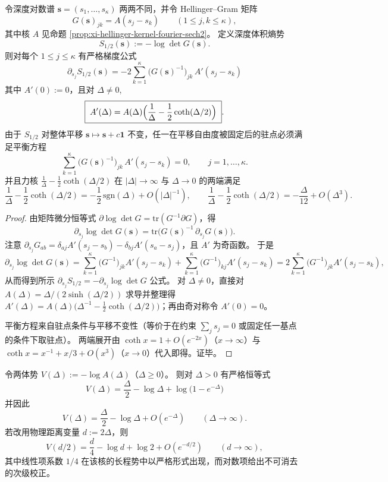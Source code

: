 \begin{proposition}[深度体积熵势的精确一阶变分与平衡方程]\label{prop:xi-hellinger-gram-first-variation-equilibrium}
令深度对数谱 \(\mathbf s=(s_1,\dots,s_\kappa)\) 两两不同，并令 Hellinger--Gram 矩阵
\[
G(\mathbf s)_{jk}=A(s_j-s_k)\qquad(1\le j,k\le \kappa),
\]
其中核 \(A\) 见命题 \ref{prop:xi-hellinger-kernel-fourier-sech2}。
定义深度体积熵势
\[
S_{1/2}(\mathbf s):=-\log\det G(\mathbf s).
\]
则对每个 \(1\le j\le \kappa\) 有严格梯度公式
\[
\boxed{\;
\partial_{s_j}S_{1/2}(\mathbf s)
=-2\sum_{k=1}^{\kappa}\bigl(G(\mathbf s)^{-1}\bigr)_{jk}\,A'(s_j-s_k)\;}
\]
其中 \(A'(0):=0\)，且对 \(\Delta\neq 0\),
\[
\boxed{\;
A'(\Delta)
=A(\Delta)\Bigl(\frac{1}{\Delta}-\frac12\coth(\Delta/2)\Bigr)\; }.
\]
由于 \(S_{1/2}\) 对整体平移 \(\mathbf s\mapsto \mathbf s+c\mathbf 1\) 不变，任一在平移自由度被固定后的驻点必须满足平衡方程
\[
\sum_{k=1}^{\kappa}\bigl(G(\mathbf s)^{-1}\bigr)_{jk}\,A'(s_j-s_k)=0,\qquad j=1,\dots,\kappa.
\]
并且力核 \(\frac{1}{\Delta}-\frac12\coth(\Delta/2)\) 在 \(|\Delta|\to\infty\) 与 \(\Delta\to 0\) 的两端满足
\[
\frac{1}{\Delta}-\frac12\coth(\Delta/2)= -\frac12\,\mathrm{sgn}(\Delta)+O(|\Delta|^{-1}),
\qquad
\frac{1}{\Delta}-\frac12\coth(\Delta/2)=-\frac{\Delta}{12}+O(\Delta^3).
\]
\end{proposition}
\begin{proof}
由矩阵微分恒等式 \(\partial\log\det G=\mathrm{tr}(G^{-1}\partial G)\)，得
\[
\partial_{s_j}\log\det G(\mathbf s)=\mathrm{tr}\bigl(G(\mathbf s)^{-1}\,\partial_{s_j}G(\mathbf s)\bigr).
\]
注意 \(\partial_{s_j}G_{ab}=\delta_{aj}A'(s_j-s_b)-\delta_{bj}A'(s_a-s_j)\)，且 \(A'\) 为奇函数。
于是
\[
\partial_{s_j}\log\det G(\mathbf s)
=\sum_{k=1}^{\kappa}\bigl(G^{-1}\bigr)_{jk}A'(s_j-s_k)
+\sum_{k=1}^{\kappa}\bigl(G^{-1}\bigr)_{kj}A'(s_j-s_k)
=2\sum_{k=1}^{\kappa}\bigl(G^{-1}\bigr)_{jk}A'(s_j-s_k),
\]
从而得到所示 \(\partial_{s_j}S_{1/2}=-\partial_{s_j}\log\det G\) 公式。
对 \(\Delta\neq 0\)，直接对 \(A(\Delta)=\Delta/(2\sinh(\Delta/2))\) 求导并整理得
\(
A'(\Delta)=A(\Delta)\bigl(\Delta^{-1}-\tfrac12\coth(\Delta/2)\bigr)
\)；再由奇对称令 \(A'(0)=0\)。
\par
平衡方程来自驻点条件与平移不变性（等价于在约束 \(\sum_j s_j=0\) 或固定任一基点的条件下取驻点）。
两端展开由 \(\coth x=1+O(e^{-2x})\)（\(x\to\infty\)）与
\(\coth x=x^{-1}+x/3+O(x^3)\)（\(x\to 0\)）代入即得。证毕。
\end{proof}

\begin{remark}\label{rem:xi-hellinger-two-body-potential-area-log}
令两体势 \(V(\Delta):=-\log A(\Delta)\)（\(\Delta\ge 0\)）。
则对 \(\Delta>0\) 有严格恒等式
\[
\boxed{\;
V(\Delta)=\frac{\Delta}{2}-\log\Delta+\log\bigl(1-e^{-\Delta}\bigr)\;}
\]
并因此
\[
V(\Delta)=\frac{\Delta}{2}-\log\Delta+O(e^{-\Delta})\qquad(\Delta\to\infty).
\]
若改用物理距离变量 \(d:=2\Delta\)，则
\[
V(d/2)=\frac{d}{4}-\log d+\log 2+O(e^{-d/2})\qquad(d\to\infty),
\]
其中线性项系数 \(1/4\) 在该核的长程势中以严格形式出现，而对数项给出不可消去的次级校正。
\end{remark}

